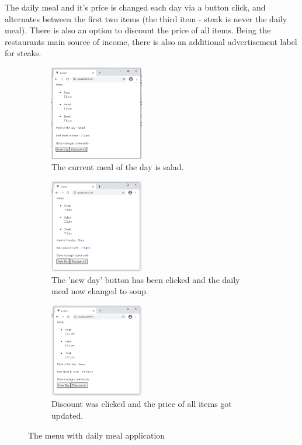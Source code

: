 The daily meal and it's price is changed each day via a button click, and alternates between the first two items (the third item - steak is never the daily meal). There is also an option to discount the price of all items. Being the restaurants main source of income, there is also an additional advertisement label for steaks.
\begin{figure}[H]
    \centering
    \begin{subfigure}[b]{0.45\textwidth}
         \centering
         \includegraphics[width=0.45\textwidth]{images/meal_1.png}
         \caption{The current meal of the day is salad.}
    \end{subfigure}\hfill%
    \begin{subfigure}[b]{0.45\textwidth}
        \centering
        \includegraphics[width=0.45\textwidth]{images/meal_2.png}
        \caption{The 'new day' button has been clicked and the daily meal now changed to soup.}
    \end{subfigure}\hfill%
    \begin{subfigure}[b]{0.45\textwidth}
        \centering
        \includegraphics[width=0.45\textwidth]{images/meal_3.png}
        \caption{Discount was clicked and the price of all items got updated.}
    \end{subfigure}
    \caption{The menu with daily meal application }
    \label{fig:eval_image_meal}
\end{figure}

